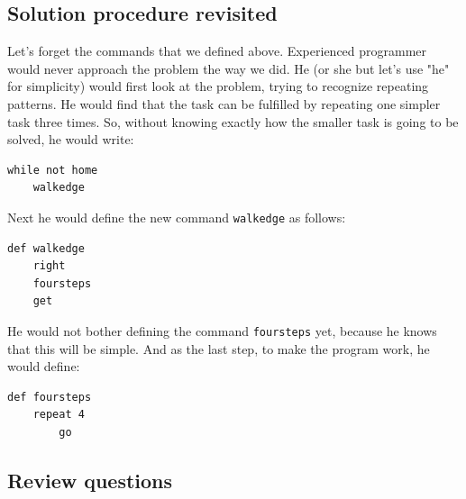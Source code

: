 {{{{\subsection{Solution procedure revisited}

Let's forget the commands that we defined above.
Experienced programmer would never approach the problem the way we did.
He (or she but let's use "he" for simplicity) 
would first look at the problem, trying to recognize repeating patterns. 
He would find that the task can be fulfilled by repeating one simpler task 
three times. So, without knowing exactly how the smaller task is going to 
be solved, he would write:

{\small
\begin{verbatim}
while not home
    walkedge
\end{verbatim}
}
\noindent
Next he would define the new command {\tt walkedge} as follows:

{\small
\begin{verbatim}
def walkedge
    right
    foursteps
    get
\end{verbatim}
}
\noindent
He would not bother defining the command 
{\tt foursteps} yet, because he knows that this will be 
simple. And as the last step, to make the program work, he would 
define:

{\small
\begin{verbatim}
def foursteps
    repeat 4
        go
\end{verbatim}
}

\subsection{Review questions}

}}}}
